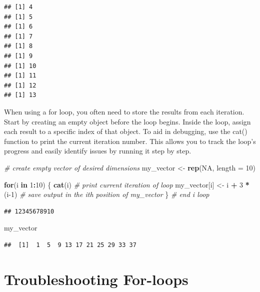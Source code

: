 \documentclass[
]{book}
\newenvironment{Shaded}{\begin{snugshade}}{\end{snugshade}}
\newcommand{\AttributeTok}[1]{\textcolor[rgb]{0.13,0.29,0.53}{#1}}
\newcommand{\CommentTok}[1]{\textcolor[rgb]{0.56,0.35,0.01}{\textit{#1}}}
\newcommand{\ConstantTok}[1]{\textcolor[rgb]{0.56,0.35,0.01}{#1}}
\newcommand{\ControlFlowTok}[1]{\textcolor[rgb]{0.13,0.29,0.53}{\textbf{#1}}}
\newcommand{\DecValTok}[1]{\textcolor[rgb]{0.00,0.00,0.81}{#1}}
\newcommand{\FunctionTok}[1]{\textcolor[rgb]{0.13,0.29,0.53}{\textbf{#1}}}
\newcommand{\NormalTok}[1]{#1}
\newcommand{\OtherTok}[1]{\textcolor[rgb]{0.56,0.35,0.01}{#1}}
\newcommand{\SpecialCharTok}[1]{\textcolor[rgb]{0.81,0.36,0.00}{\textbf{#1}}}
\begin{document}
\begin{verbatim}
## [1] 4
## [1] 5
## [1] 6
## [1] 7
## [1] 8
## [1] 9
## [1] 10
## [1] 11
## [1] 12
## [1] 13
\end{verbatim}

When using a for loop, you often need to store the results from each iteration. Start by creating an empty object before the loop begins. Inside the loop, assign each result to a specific index of that object. To aid in debugging, use the cat() function to print the current iteration number. This allows you to track the loop's progress and easily identify issues by running it step by step.

\begin{Shaded}
\begin{Highlighting}[]
\CommentTok{\# create empty vector of desired dimensions}
\NormalTok{my\_vector }\OtherTok{\textless{}{-}} \FunctionTok{rep}\NormalTok{(}\ConstantTok{NA}\NormalTok{, }\AttributeTok{length =} \DecValTok{10}\NormalTok{)}

\ControlFlowTok{for}\NormalTok{(i }\ControlFlowTok{in} \DecValTok{1}\SpecialCharTok{:}\DecValTok{10}\NormalTok{) \{}
  \FunctionTok{cat}\NormalTok{(i) }\CommentTok{\# print current iteration of loop}
\NormalTok{  my\_vector[i] }\OtherTok{\textless{}{-}}\NormalTok{ i }\SpecialCharTok{+} \DecValTok{3} \SpecialCharTok{*}\NormalTok{ (i}\DecValTok{{-}1}\NormalTok{) }\CommentTok{\# save output in the ith position of my\_vector}
\NormalTok{\} }\CommentTok{\# end i loop}
\end{Highlighting}
\end{Shaded}

\begin{verbatim}
## 12345678910
\end{verbatim}

\begin{Shaded}
\begin{Highlighting}[]
\NormalTok{my\_vector}
\end{Highlighting}
\end{Shaded}

\begin{verbatim}
##  [1]  1  5  9 13 17 21 25 29 33 37
\end{verbatim}

\section{Troubleshooting For-loops}\label{troubleshooting-for-loops}
\end{document}
